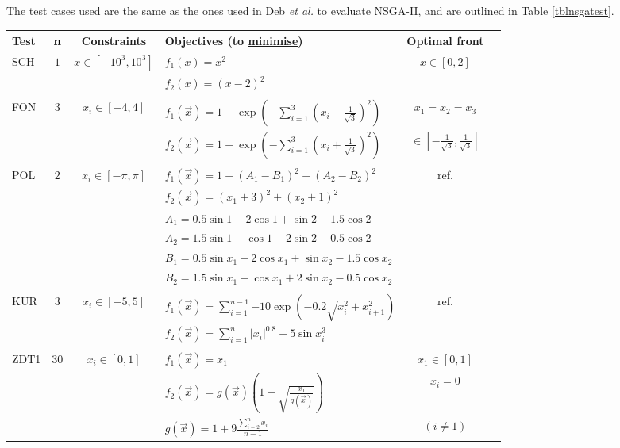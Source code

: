 \documentclass[12pt,a4paper,twoside,openright]{report}
\begin{document}
The test cases used are the same as the ones used in Deb \emph{et al.} \cite{deb2002fast} to evaluate NSGA-II, and are outlined in Table \ref{tblnsgatest}.

\begin{table}
\hspace*{-1.05cm}\begin{tabular}{ l c c l c l } \toprule
{\bf Test} & {$\bf{n}$} & {\bf Constraints} & {\bf Objectives (to \underline{minimise})} & {\bf Optimal front}\\ \midrule
SCH & $1$ & $x \in [-10^3, 10^3]$ & $f_1(x) = x^2$ & $x\in [0, 2]$ &\\
& & & $f_2(x) =(x-2)^2$ &\\
& & & & &\\
FON & $3$ & $x_i \in [-4, 4]$ & $f_1(\vec{x}) = 1 - \exp{\left(-\sum_{i=1}^3 {\left(x_i - \frac{1}{\sqrt{3}}\right)^2}\right)}$ & $x_1 = x_2 = x_3$\\
 &  &  & $f_2(\vec{x}) = 1 - \exp{\left(-\sum_{i=1}^3 {\left(x_i + \frac{1}{\sqrt{3}}\right)^2}\right)}$ & $\in [-\frac{1}{\sqrt{3}}, \frac{1}{\sqrt{3}}]$\\
 & & & & &\\
POL & $2$ & $x_i \in [-\pi, \pi]$ & $f_1(\vec{x}) = 1 + (A_1 - B_1)^2 + (A_2 - B_2)^2$ & ref. \cite{deb2001multi} \\
 & & & $f_2(\vec{x}) = (x_1+3)^2 + (x_2+1)^2$ &\\
 & & & $A_1 = 0.5\sin{1} - 2\cos{1} + \sin{2} - 1.5\cos{2}$ &\\
 & & & $A_2 = 1.5\sin{1} - \cos{1} + 2\sin{2} - 0.5\cos{2}$ &\\
 & & & $B_1 = 0.5\sin{x_1} - 2\cos{x_1} + \sin{x_2} - 1.5\cos{x_2}$ &\\
 & & & $B_2 = 1.5\sin{x_1} - \cos{x_1} + 2\sin{x_2} - 0.5\cos{x_2}$ &\\
 & & & & &\\
KUR & $3$ & $x_i \in [-5, 5]$ & $f_1(\vec{x}) = \sum_{i=1}^{n-1}{-10\exp{\left(-0.2\sqrt{x_i^2 + x_{i+1}^2}\right)}}$ & ref. \cite{deb2001multi} \\
 & & & $f_2(\vec{x}) = \sum_{i=1}^{n}{|x_i|^{0.8} + 5\sin{x_i^3}}$ &\\
 & & & & &\\
ZDT1 & $30$ & $x_i \in [0, 1]$ & $f_1(\vec{x}) = x_1$ & $x_1\in [0, 1]$\\
 & & & $f_2(\vec{x}) = g(\vec{x})\left(1-\sqrt{\frac{x_1}{g(\vec{x})}}\right)$ & $x_i = 0$\\
 & & & $g(\vec{x}) = 1 + 9\frac{\sum_{i=2}^n {x_i}}{n-1}$ & $(i \neq 1)$\\

\end{tabular}
\end{table}
\end{document}
